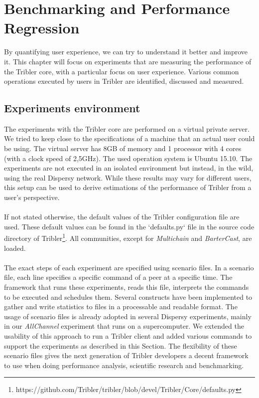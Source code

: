 \label{chapter:experiments}
\chapter{Benchmarking and Performance Regression}

By quantifying user experience, we can try to understand it better and improve it. This chapter will focus on experiments that are measuring the performance of the Tribler core, with a particular focus on user experience. Various common operations executed by users in Tribler are identified, discussed and measured.

\section{Experiments environment}
The experiments with the Tribler core are performed on a virtual private server. We tried to keep close to the specifications of a machine that an actual user could be using. The virtual server has 8GB of memory and 1 processor with 4 cores (with a clock speed of 2,5GHz). The used operation system is Ubuntu 15.10. The experiments are not executed in an isolated environment but instead, in the wild, using the real Dispersy network. While these results may vary for different users, this setup can be used to derive estimations of the performance of Tribler from a user's perspective.\\\\
If not stated otherwise, the default values of the Tribler configuration file are used. These default values can be found in the `defaults.py` file in the source code directory of Tribler\footnote{https://github.com/Tribler/tribler/blob/devel/Tribler/Core/defaults.py}. All communities, except for \emph{Multichain} and \emph{BarterCast}, are loaded.\\\\
The exact steps of each experiment are specified using scenario files. In a scenario file, each line specifies a specific command of a peer at a specific time. The framework that runs these experiments, reads this file, interprets the commands to be executed and schedules them. Several constructs have been implemented to gather and write statistics to files in a processable and readable format. The usage of scenario files is already adopted in several Dispersy experiments, mainly in our \emph{AllChannel} experiment that runs on a supercomputer. We extended the usability of this approach to run a Tribler client and added various commands to support the experiments as described in this Section. The flexibility of these scenario files gives the next generation of Tribler developers a decent framework to use when doing performance analysis, scientific research and benchmarking.

